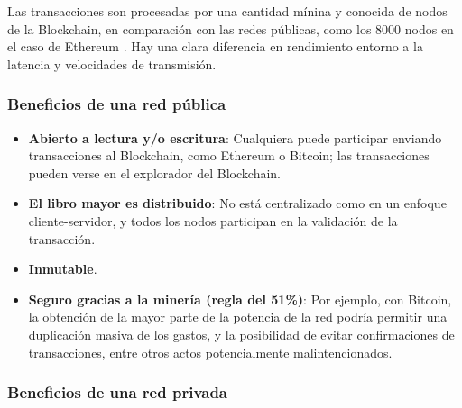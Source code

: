 \vspace{5mm}

\noindent Las transacciones son procesadas por una cantidad mínina y conocida de nodos de la Blockchain, en comparación 
con las redes públicas, como los 8000 nodos en el caso de Ethereum \cite{ethereum-nodes}. Hay una clara diferencia en 
rendimiento entorno a la latencia y velocidades de transmisión.

\subsubsection*{Beneficios de una red pública}

\begin{itemize}
\item \textbf{Abierto a lectura y/o escritura}: Cualquiera puede participar enviando transacciones al Blockchain, como 
Ethereum o Bitcoin; las transacciones pueden verse en el explorador del Blockchain.

\item \textbf{El libro mayor es distribuido}: No está centralizado como en un enfoque cliente-servidor, y todos los 
nodos participan en la validación de la transacción.

\item \textbf{Inmutable}.

\item \textbf{Seguro gracias a la minería (regla del 51\%)}: Por ejemplo, con Bitcoin, la obtención de la mayor parte 
de la potencia de la red podría permitir una duplicación masiva de los gastos, y la posibilidad de evitar 
confirmaciones de transacciones, entre otros actos potencialmente malintencionados.
\end{itemize}

\subsubsection*{Beneficios de una red privada}

